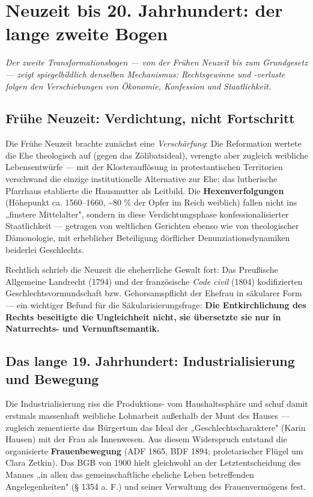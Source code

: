 \documentclass[11pt,a4paper,ngerman]{scrartcl}
\newcommand{\chipbase}[2]{\hspace{0pt}{\footnotesize\textcolor{#1}{[\textsc{#2}]}}}
\newcommand{\chipbelegt}[1]{\chipbase{chipgreen}{#1}}
\begin{document}
\section{Neuzeit bis 20. Jahrhundert: der lange zweite Bogen}

\noindent\textit{Der zweite Transformationsbogen — von der Frühen Neuzeit bis zum Grundgesetz — zeigt spiegelbildlich denselben Mechanismus: Rechtsgewinne und -verluste folgen den Verschiebungen von Ökonomie, Konfession und Staatlichkeit.}
\medskip

\subsection*{Frühe Neuzeit: Verdichtung, nicht Fortschritt}

Die Frühe Neuzeit brachte zunächst eine \emph{Verschärfung}: Die Reformation wertete die Ehe theologisch auf (gegen das Zölibatsideal), verengte aber zugleich weibliche Lebensentwürfe — mit der Klosterauflösung in protestantischen Territorien verschwand die einzige institutionelle Alternative zur Ehe; das lutherische Pfarrhaus etablierte die Hausmutter als Leitbild. \chipbelegt{belegt} Die \textbf{Hexenverfolgungen} (Höhepunkt ca. 1560–1660, \textasciitilde{}80 \% der Opfer im Reich weiblich) fallen nicht ins „finstere Mittelalter", sondern in diese Verdichtungsphase konfessionalisierter Staatlichkeit — getragen von weltlichen Gerichten ebenso wie von theologischer Dämonologie, mit erheblicher Beteiligung dörflicher Denunziationsdynamiken beiderlei Geschlechts. \chipbelegt{belegt}

Rechtlich schrieb die Neuzeit die eheherrliche Gewalt fort: Das Preußische Allgemeine Landrecht (1794) und der französische \emph{Code civil} (1804) kodifizierten Geschlechtsvormundschaft bzw. Gehorsamspflicht der Ehefrau in säkularer Form — ein wichtiger Befund für die Säkularisierungsfrage: \textbf{Die Entkirchlichung des Rechts beseitigte die Ungleichheit nicht, sie übersetzte sie nur in Naturrechts- und Vernunftsemantik.} \chipbelegt{belegt}

\subsection*{Das lange 19. Jahrhundert: Industrialisierung und Bewegung}

Die Industrialisierung riss die Produktions- vom Haushaltssphäre und schuf damit erstmals massenhaft weibliche Lohnarbeit außerhalb der Munt des Hauses — zugleich zementierte das Bürgertum das Ideal der „Geschlechtscharaktere" (Karin Hausen) mit der Frau als Innenwesen. Aus diesem Widerspruch entstand die organisierte \textbf{Frauenbewegung} (ADF 1865, BDF 1894; proletarischer Flügel um Clara Zetkin). Das BGB von 1900 hielt gleichwohl an der Letztentscheidung des Mannes „in allen das gemeinschaftliche eheliche Leben betreffenden Angelegenheiten" (§ 1354 a. F.) und seiner Verwaltung des Frauenvermögens fest. \chipbelegt{belegt}
\end{document}
